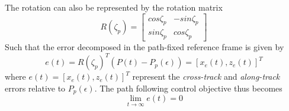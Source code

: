 The rotation can also be represented by the rotation matrix
\begin{equation}
    R(\zeta_p) = \begin{bmatrix}
        cos\zeta_p & -sin\zeta_p \\
        sin \zeta_p & cos\zeta_p 
    \end{bmatrix}
\end{equation}
Such that the error decomposed in the path-fixed reference frame is given by
\begin{equation}
    e(t) = R(\zeta_p)^T(P(t) - P_p(\epsilon)) = [x_e(t), z_e(t)]^T
\end{equation}
where \(e(t) = [x_e(t), z_e(t)]^T\) represent the \textit{cross-track} and \textit{along-track} errors relative to \(P_p(\epsilon)\). The path following control objective thus becomes
\begin{equation}
    \lim_{t\to\infty} e(t) = 0
\end{equation}

